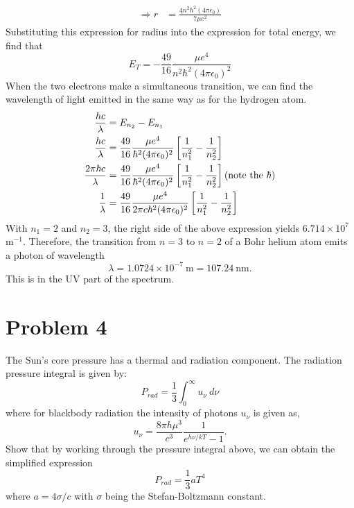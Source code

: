 \documentclass[12pt]{article}
\begin{document}
\begin{adjustwidth}{2.5em}{0pt}
\begin{siderules}
{\begin{equation}
\begin{aligned}
\Rightarrow r &= \frac{4n^2\hbar^2(4\pi \epsilon_0)}{7\mu e^2}
\end{aligned}
\end{equation}
Substituting this expression for radius into the expression for total energy, we find that
\begin{equation}
E_T = -\frac{49}{16}\frac{\mu e^4}{n^2\hbar^2(4\pi\epsilon_0)^2}
\end{equation}
When the two electrons make a simultaneous transition, we can find the wavelength of light emitted in the same way as for the hydrogen atom.
\begin{equation}
\begin{aligned}
\frac{hc}{\lambda} &= E_{n_2} - E_{n_1} \\
\frac{hc}{\lambda} &= \frac{49}{16}\frac{\mu e^4}{\hbar^2(4\pi\epsilon_0)^2}\left[ \frac{1}{n_1^2} - \frac{1}{n_2^2} \right] \\
\frac{2\pi \hbar c}{\lambda} &= \frac{49}{16}\frac{\mu e^4}{\hbar^2(4\pi\epsilon_0)^2}\left[ \frac{1}{n_1^2} - \frac{1}{n_2^2} \right] \hfill (\text{note the } \hbar) \\
\frac{1}{\lambda} &= \frac{49}{16}\frac{\mu e^4}{2\pi c \hbar^2(4\pi\epsilon_0)^2}\left[ \frac{1}{n_1^2} - \frac{1}{n_2^2} \right]
\end{aligned}
\end{equation}
With $n_1 = 2$ and $n_2 = 3$, the right side of the above expression yields $6.714 \times 10^7$ m$^{-1}$. Therefore, the transition from $n = 3$ to $n = 2$ of a Bohr helium atom emits a photon of wavelength
\begin{equation}
\lambda = 1.0724 \times 10^{-7} ~\text{m} = 107.24 ~\text{nm}.
\end{equation}
This is in the UV part of the spectrum.
 }
\end{siderules}
\end{adjustwidth}

\section*{Problem 4}
The Sun's core pressure has a thermal and radiation component. The radiation pressure integral is given by:
\begin{equation*}
P_{rad} = \frac{1}{3} \int_{0}^{\infty} u_{\nu} ~d\nu
\end{equation*}
where for blackbody radiation the intensity of photons $u_{\nu}$ is given as,
\begin{equation*}
u_{\nu} = \frac{8\pi h\mu^3}{c^3}\frac{1}{e^{h\nu /kT}-1}.
\end{equation*}
Show that by working through the pressure integral above, we can obtain the simplified expression 
\begin{equation*}
P_{rad} = \frac{1}{3}aT^4
\end{equation*}
where $a = 4\sigma/c$ with $\sigma$ being the Stefan-Boltzmann constant.
\end{document}
